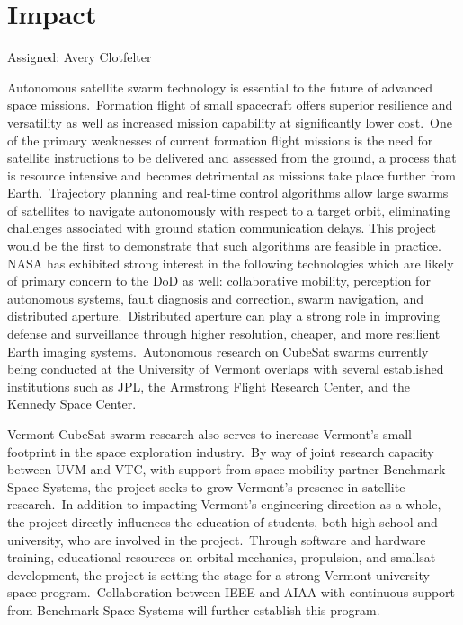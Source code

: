 \section{Impact}
Assigned: Avery Clotfelter

Autonomous satellite swarm technology is essential to the future of
advanced space missions. Formation flight of small spacecraft offers
superior resilience and versatility as well as increased mission
capability at significantly lower cost. One of the primary weaknesses
of current formation flight missions is the need for satellite
instructions to be delivered and assessed from the ground, a process
that is resource intensive and becomes detrimental as missions take
place further from Earth. Trajectory planning and real-time control 
algorithms allow large swarms of satellites to navigate autonomously 
with respect to a target orbit, eliminating challenges associated with
ground station communication delays. This project would be the first to
demonstrate that such algorithms are feasible in practice. NASA has exhibited 
strong interest in the following technologies which are likely of primary concern to the DoD
as well: collaborative mobility, perception for autonomous systems,
fault diagnosis and correction, swarm navigation, and distributed
aperture. Distributed aperture can play a strong role in improving
defense and surveillance through higher resolution, cheaper, and more
resilient Earth imaging systems. Autonomous research on CubeSat
swarms currently being conducted at the University of Vermont overlaps
with several established institutions such as JPL, the Armstrong
Flight Research Center, and the Kennedy Space Center. 

Vermont CubeSat swarm research also serves to increase Vermont’s small
footprint in the space exploration industry. By way of joint research
capacity between UVM and VTC, with support from space mobility partner
Benchmark Space Systems, the project seeks to grow Vermont’s presence
in satellite research. In addition to impacting Vermont’s engineering
direction as a whole, the project directly influences the education of
students, both high school and university, who are involved in the
project. Through software and hardware training, educational
resources on orbital mechanics, propulsion, and smallsat development,
the project is setting the stage for a strong Vermont university space
program. Collaboration between IEEE and AIAA with continuous support
from Benchmark Space Systems will further establish this program.

